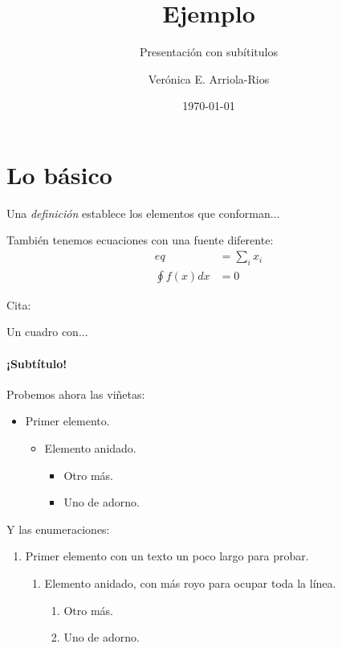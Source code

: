 \documentclass[aspectratio=169,usenames,dvipsnames,svgnames,table]{beamer}
\title{Ejemplo}
\subtitle{Presentación con subítitulos}
\author[Ver\'onica E. Arriola-Rios]{Verónica E. Arriola-Rios}
\institute{Facultad de Ciencias, UNAM}
\date{\today}
\begin{document}
\frame{\titlepage}

\section{Lo básico}

\begin{frame}
\begin{definition}[Definición]
 Una \emph{definición} establece los elementos que conforman...
\end{definition}

También tenemos ecuaciones con una fuente diferente:
\begin{align}
 eq &= \sum_{i} x_i \\
 \oint f(x) dx &= 0
\end{align}

Cita: \cite{Viso2012}

\end{frame}



\begin{frame}{Un cuadro con...}
\framesubtitle{¡Subtítulo!}
Probemos ahora las viñetas:
\begin{itemize}
 \item Primer elemento.
 \begin{itemize}
  \item Elemento anidado.
  \begin{itemize}
   \item Otro más.
   \item Uno de adorno.
  \end{itemize}
 \end{itemize}
\end{itemize}

Y las enumeraciones:
\begin{enumerate}
 \item Primer elemento con un texto un poco largo para probar.
 \begin{enumerate}
  \item Elemento anidado, con más royo para ocupar toda la línea.
  \begin{enumerate}
   \item Otro más.
   \item Uno de adorno.
  \end{enumerate}
 \end{enumerate}
\end{enumerate}

\end{frame}
\end{document}
